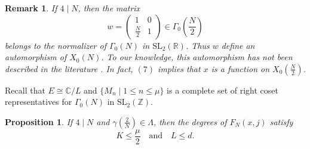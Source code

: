 \documentclass[10pt, a4paper]{article}
\newtheorem{proposition}[theorem]{Proposition}
\newtheorem{remark}[theorem]{Remark}
\begin{document}
\begin{remark}
If $4 \mid N$, then the matrix
\[
w = \begin{pmatrix}
1 & 0 \\
\frac{N}{2} & 1
\end{pmatrix} \in \Gamma_0\left(\frac{N}{2}\right)
\]
 belongs to the normalizer of $\Gamma_0(N)$ in $\mathrm{SL}_2(\mathbb{R})$. Thus $w$ define an automorphism of $X_0(N)$. To our knowledge, this automorphism  has not been described in the literature \cite{Atkin-Lehner}. In fact,  $(7)$  implies  that $x$  is a function on $X_0(\frac{N}{2})$.
\end{remark}

Recall that $E \cong \mathbb{C}/L$ and $\{M_n \mid 1 \leq n \leq \mu\}$ is a complete set of right coset representatives for $\Gamma_0(N)$ in $\mathrm{SL}_2(\mathbb{Z})$.
\begin{proposition}
If $4 \mid N$ and $\gamma\left(\frac{2}{N}\right) \in \Lambda$, then the degrees of $F_N(x,j)$  satisfy
\[
K \leq \frac{\mu}{2} \quad \text{and} \quad L \leq d.
\]
\end{proposition}
\end{document}
